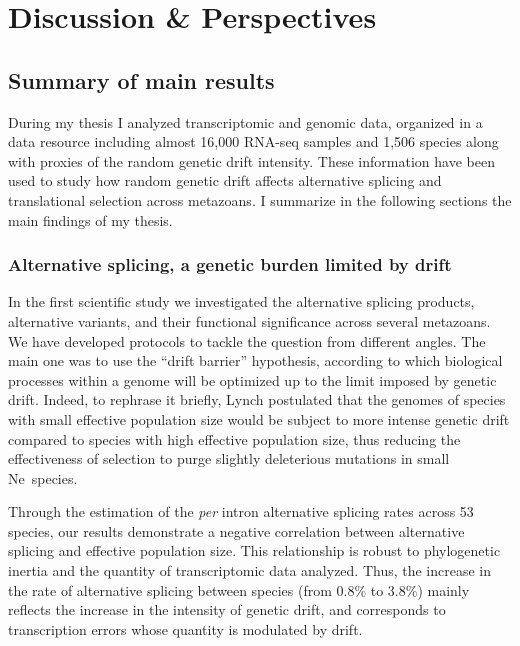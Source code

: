 \thispagestyle{empty}
\chapter[Discussion \& Perspectives]{Discussion \& Perspectives}
{\hypersetup{linkcolor=GREYDARK}\minitoc}

\section{Summary of main results}

During my thesis I analyzed transcriptomic and genomic data, organized in a data resource including almost 16,000 RNA-seq samples and 1,506 species along with proxies of the random  \gls{genetic drift} intensity. These information have been used to study how random  \gls{genetic drift} affects alternative splicing and \gls{translational selection} across metazoans. I summarize in the following sections the main findings of my thesis.


\subsection{Alternative splicing, a genetic burden limited by drift}

In the first scientific study we investigated the alternative splicing products, alternative variants, and their functional significance across several metazoans. We have developed protocols to tackle the question from different angles. The main one was to use the “drift barrier” hypothesis, according to which biological processes within a genome will be optimized up to the limit imposed by  \gls{genetic drift}. Indeed, to rephrase it briefly, Lynch postulated that the genomes of species with small \gls{effective population size} would be subject to more intense  \gls{genetic drift} compared to species with high \gls{effective population size}, thus reducing the effectiveness of selection to purge slightly deleterious mutations in small \acrshort{Ne}~species.

Through the estimation of the \textit{per} intron alternative splicing rates across 53 species, our results demonstrate a negative correlation between alternative splicing and \gls{effective population size}. This relationship is robust to phylogenetic inertia and the quantity of transcriptomic data analyzed. Thus, the increase in the rate of alternative splicing between species (from 0.8\% to 3.8\%) mainly reflects the increase in the intensity of  \gls{genetic drift}, and corresponds to transcription errors whose quantity is modulated by drift.

